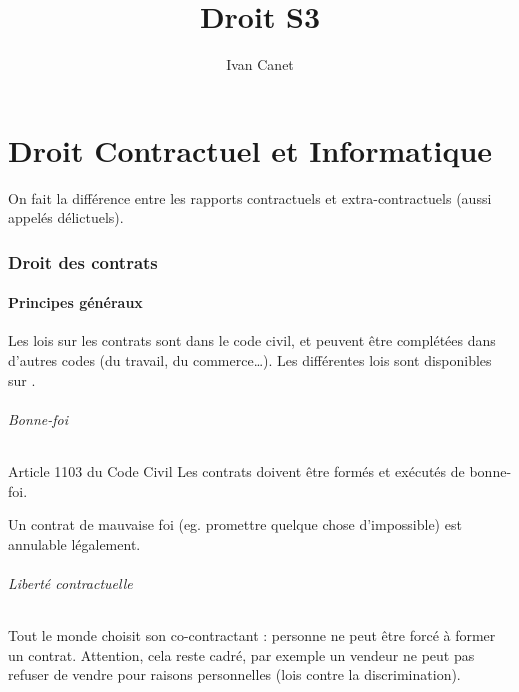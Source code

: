 \documentclass[10pt,a4paper,french]{article}
\begin{document}
\title{Droit S3}
\author{Ivan Canet}
\maketitle


\tableofcontents

\part{Droit Contractuel et Informatique}

On fait la différence entre les rapports contractuels et extra-contractuels (aussi appelés délictuels).

\section{Droit des contrats}

\subsection{Principes généraux}

Les lois sur les contrats sont dans le code civil, et peuvent être complétées dans d'autres codes (du travail, du commerce\ldots). Les différentes lois sont disponibles sur .

\paragraph{Bonne-foi}

\begin{cquote}{Article 1103 du Code Civil}
Les contrats doivent être formés et exécutés de bonne-foi.
\end{cquote}

Un contrat de mauvaise foi (eg. promettre quelque chose d'impossible) est annulable légalement.

\paragraph{Liberté contractuelle}
Tout le monde choisit son co-contractant : personne ne peut être forcé à former un contrat. Attention, cela reste cadré, par exemple un vendeur ne peut pas refuser de vendre pour raisons personnelles (lois contre la discrimination).
\end{document}
